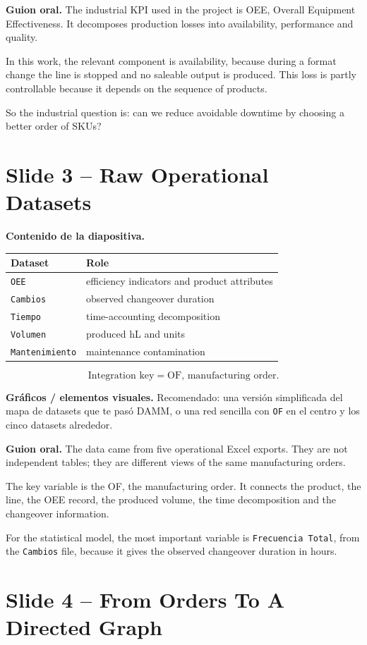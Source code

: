 \documentclass[11pt,a4paper]{article}
\newcommand{\slide}[1]{\newpage\section*{#1}}
\newcommand{\say}{\textbf{Guion oral.} }
\newcommand{\content}{\textbf{Contenido de la diapositiva.} }
\newcommand{\figs}{\textbf{Gráficos / elementos visuales.} }
\begin{document}
\say
The industrial KPI used in the project is OEE, Overall Equipment Effectiveness.
It decomposes production losses into availability, performance and quality.

In this work, the relevant component is availability, because during a format
change the line is stopped and no saleable output is produced. This loss is
partly controllable because it depends on the sequence of products.

So the industrial question is: can we reduce avoidable downtime by choosing a
better order of SKUs?

\slide{Slide 3 -- Raw Operational Datasets}

\content
\begin{table}[H]\centering
\begin{tabular}{@{}ll@{}}
\toprule
Dataset & Role \\
\midrule
\texttt{OEE} & efficiency indicators and product attributes \\
\texttt{Cambios} & observed changeover duration \\
\texttt{Tiempo} & time-accounting decomposition \\
\texttt{Volumen} & produced hL and units \\
\texttt{Mantenimiento} & maintenance contamination \\
\bottomrule
\end{tabular}
\end{table}

\[
\text{Integration key} = \text{OF, manufacturing order}.
\]

\figs
Recomendado: una versi\'on simplificada del mapa de datasets que te pas\'o DAMM,
o una red sencilla con \texttt{OF} en el centro y los cinco datasets alrededor.

\say
The data came from five operational Excel exports. They are not independent
tables; they are different views of the same manufacturing orders.

The key variable is the OF, the manufacturing order. It connects the product,
the line, the OEE record, the produced volume, the time decomposition and the
changeover information.

For the statistical model, the most important variable is
\texttt{Frecuencia Total}, from the \texttt{Cambios} file, because it gives the
observed changeover duration in hours.

\slide{Slide 4 -- From Orders To A Directed Graph}
\end{document}
